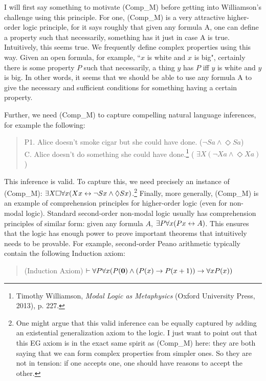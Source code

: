 I will first say something to motivate (Comp_M) before getting into Williamson's challenge using this principle. For one, (Comp_M) is a very attractive higher-order logic principle, for it says roughly that given any formula A, one can define a property such that necessarily, something has it just in case A is true. Intuitively, this seems true. We frequently define complex properties using this way. Given an open formula, for example, ``$x$ is white and $x$ is big", certainly there is some property $P$ such that necessarily, a thing $y$ has $P$ iff $y$ is white and $y$ is big. In other words, it seems that we should be able to use any formula A to give the necessary and sufficient conditions for something having a certain property. 

Further, we need (Comp_M) to capture compelling natural language inferences, for example the following: 
\begin{quote}
P1. Alice doesn't smoke cigar but she could have done. ($\neg Sa \wedge \Diamond Sa$) \\
C. Alice doesn't do something she could have done.\footnote{Timothy Williamson, \textit{Modal Logic as Metaphysics} (Oxford University Press, 2013), p. 227.} ( $\exists X (\neg Xa \wedge \Diamond Xa)$ )
\end{quote}
This inference is valid. To capture this, we need precisely an instance of (Comp_M): $\exists X \Box \forall x (Xx \leftrightarrow \neg Sx \wedge \Diamond Sx)$.\footnote{One might argue that this valid inference can be equally captured by adding an existential generalization axiom to the logic. I just want to point out that this EG axiom is in the exact same spirit as (Comp_M) here: they are both saying that we can form complex properties from simpler ones. So they are not in tension: if one accepts one, one should have reasons to accept the other. } 
Finally, more generally, (Comp_M) is an example of comprehension principles for higher-order logic (even for non-modal logic). Standard second-order non-modal logic usually has comprehension principles of similar form: given any formula $A$, $\exists P \forall x (Px \leftrightarrow A)$. This ensures that the logic has enough power to prove important theorems  that intuitively needs to be provable. For example, second-order Peano arithmetic typically contain the following Induction axiom: 
\begin{quote}
(Induction Axiom) $\vdash \forall P \forall x (P(\mathbf{0}) \wedge (P(x) \rightarrow P(x+1)) \rightarrow \forall x P(x))$ 
\end{quote}
